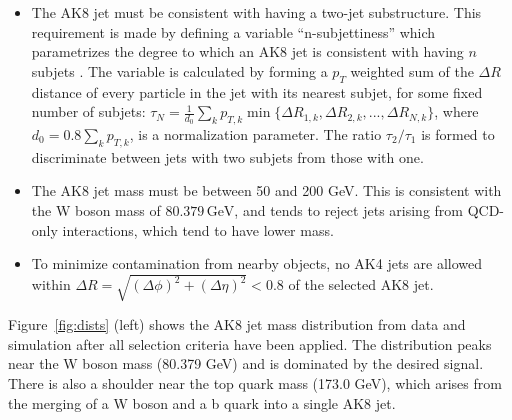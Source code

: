 \begin{itemize}

\item
The AK8 jet must be consistent with having a two-jet substructure. This requirement is made by defining a variable ``n-subjettiness'' which parametrizes the degree to which an AK8 jet is consistent with having $n$ subjets \cite{njet1, njet2}. The variable is calculated by forming a $p_{T}$ weighted sum of the $\Delta R$ distance of every particle in the jet with its nearest subjet, for some fixed number of subjets: $\tau_{N} = \frac{1}{d_{0}} \sum_{k} p_{T, k} \min \{ \Delta R_{1,k}, \Delta R_{2,k}, ..., \Delta R_{N,k} \}$, where $d_{0} = 0.8 \sum_{k} p_{T, k}$, is a normalization parameter. The ratio $\tau_{2}/\tau_{1}$ is formed to discriminate between jets with two subjets from those with one.%

\item
The AK8 jet mass must be between 50 and 200 GeV.  This is consistent with the W boson mass of $80.379\,\textrm{GeV}$, and tends to reject jets arising from QCD-only interactions, which tend to have lower mass.
\item
To minimize contamination from nearby objects, no AK4 jets are allowed within $\Delta R = \sqrt{(\Delta\phi)^2+(\Delta\eta)^2}<0.8$ of the selected AK8 jet.
\end{itemize}

Figure~\ref{fig:dists} (left) shows the AK8 jet mass distribution from data and simulation after all selection criteria have been applied. The distribution peaks near the W boson mass (80.379 GeV) and is dominated by the desired signal.  There is also a shoulder near the top quark mass (173.0 GeV), which arises from the merging of a W boson and a b quark into a single AK8 jet.

